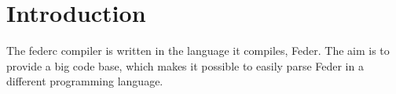 \chapter{Introduction}

The federc compiler is written in the language it compiles, Feder. The aim is to
provide a big code base, which makes it possible to easily parse Feder in a
different programming language.
